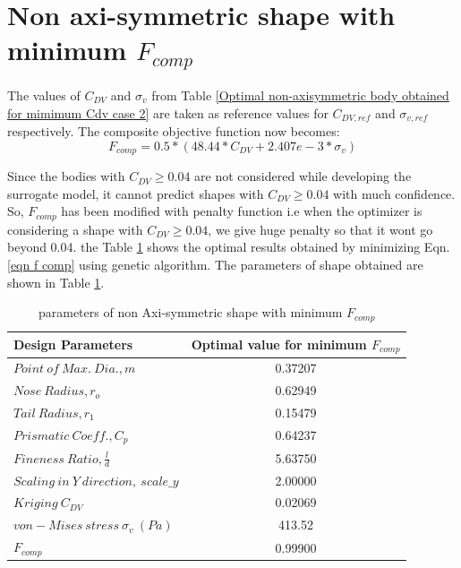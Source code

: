 \section{Non axi-symmetric shape with minimum $ F_{comp}$}

The values of $C_{DV}$ and $ {\sigma _{v}} $ from Table \ref{Optimal non-axisymmetric body obtained for mimimum Cdv case 2} are taken as reference values for $C_{DV,ref}$ and $ {\sigma _{v,ref}} $ respectively. The composite objective function now becomes:
\begin{equation}
\label{eqn f comp}
F_{comp} = 0.5*(48.44* C_{DV} + 2.407e-3 * \sigma _{v})
\end{equation}

Since the bodies with $C_{DV} \ge 0.04 $ are not considered while developing the surrogate model, it cannot predict shapes with $C_{DV} \ge 0.04 $ with much confidence. So, $ F_{comp} $ has been modified with penalty function i.e when the optimizer is considering a shape with $C_{DV} \ge 0.04 $, we give huge penalty so that it wont go beyond 0.04. the Table \ref{Optimal non-axisymmetric body obtained for mimimum F comp} shows the optimal results obtained by minimizing Eqn. \ref{eqn f comp} using genetic algorithm. The parameters of shape obtained are shown in Table \ref{Optimal non-axisymmetric body obtained for mimimum F comp}.


\begin{table}[H]
	\centering
	\caption{parameters of non Axi-symmetric shape with minimum $ F_{comp}$}
	\label{Optimal non-axisymmetric body obtained for mimimum F comp}
	\begin{tabular}{lc}
		\hline \hline
		Design Parameters & Optimal value for minimum $ F_{comp} $    \\ \hline \hline

		$ Point\ of\ Max.\ Dia., m$ & 0.37207      \\  
		$ Nose\ Radius, r _{o} $ & 0.62949    \\
		$ Tail\ Radius, r _{1} $ & 0.15479    \\  
		$ Prismatic\ Coeff., C _{p }$ & 0.64237 \\
		$ Fineness\ Ratio, \frac{l}{d} $ & 5.63750 \\
		$Scaling\ in\ Y\ direction,\ scale\_y$ & 2.00000 \\ \hline \hline
		
		$ Kriging\ C_{DV} $ & 0.02069 \\
		$ von-Mises\ stress\  \sigma _{v} \ (Pa) $ & 413.52 \\
		$ F_{comp}$ & 0.99900 \\
		\hline \hline
	\end{tabular}
\end{table}



